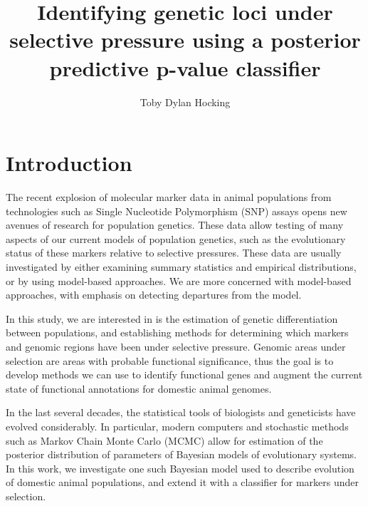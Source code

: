 \documentclass[a4paper,12pt]{article}
\title{Identifying genetic loci under selective pressure using a
  posterior predictive p-value classifier} \author{Toby Dylan Hocking}
\begin{document}
\maketitle
\tableofcontents
\listoffigures

\newcommand{\fig}[3][1]{
  \begin{figure}[htp]
    \begin{center}          %
    \texttt{[image: \#2]}
    \end{center}
    \caption{#3\label{#2}}
  \end{figure}
}
\newcommand{\brat}[2]{
  \left[
    \begin{array}{#1}
      #2
    \end{array}
    \right]
}
\newcommand{\aij}{\alpha_{ij}(t)}
\newcommand{\aijs}{\alpha_{ij}^*(t)}
\newcommand{\wij}[1]{w_{ij}^{\text{#1}}}
\newcommand{\etal}{\emph{et al.}}
\newcommand{\RR}{\mathbb R}
\newcommand{\Bin}{\operatorname{Binomial}}

\section{Introduction}

The recent explosion of molecular marker data in animal populations
from technologies such as Single Nucleotide Polymorphism (SNP) assays
opens new avenues of research for population genetics. These data
allow testing of many aspects of our current models of population
genetics, such as the evolutionary status of these markers relative to
selective pressures. These data are usually investigated by either
examining summary statistics and empirical distributions, or by using
model-based approaches. We are more concerned with model-based
approaches, with emphasis on detecting departures from the model.

In this study, we are interested in is the estimation of genetic
differentiation between populations, and establishing methods for
determining which markers and genomic regions have been under
selective pressure. Genomic areas under selection are areas with
probable functional significance, thus the goal is to develop methods
we can use to identify functional genes and augment the current state
of functional annotations for domestic animal genomes.

In the last several decades, the statistical tools of biologists and
geneticists have evolved considerably. In particular, modern computers
and stochastic methods such as Markov Chain Monte Carlo (MCMC) allow
for estimation of the posterior distribution of parameters of Bayesian
models of evolutionary systems. In this work, we investigate one such
Bayesian model used to describe evolution of domestic animal
populations, and extend it with a classifier for markers under
selection.
\end{document}
